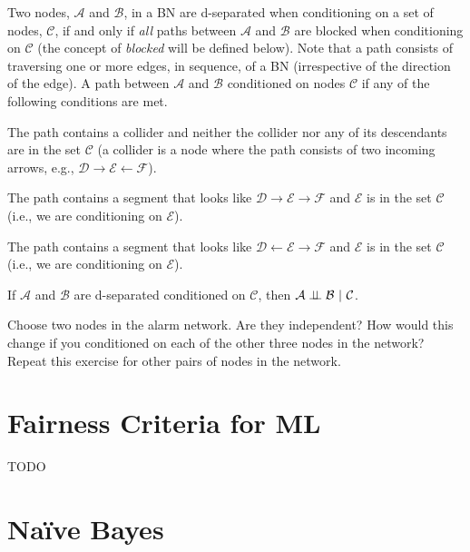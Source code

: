 \documentclass{tufte-handout}
\begin{document}
\begin{recall}
Two nodes, $\mathcal{A}$ and $\mathcal{B}$, in a BN are d-separated when conditioning on a set of nodes, $\mathcal{C}$, if and only if \emph{all} paths between  $\mathcal{A}$ and $\mathcal{B}$ are blocked when conditioning on $\mathcal{C}$ (the concept of \emph{blocked} will be defined below).  Note that a path consists of traversing one or more edges, in sequence, of a BN (irrespective of the direction of the edge).  A path between $\mathcal{A}$ and $\mathcal{B}$ conditioned on nodes $\mathcal{C}$ if any of the following conditions are met.
\be
\item The path contains a collider and neither the collider nor any of its descendants are in the set $\mathcal{C}$ (a collider is a node where the path consists of two incoming arrows, e.g., $\mathcal{D} \rightarrow \mathcal{E} \leftarrow \mathcal{F}$).
\item The path contains a segment that looks like $\mathcal{D} \rightarrow \mathcal{E} \rightarrow \mathcal{F}$ and $\mathcal{E}$ is in the set $\mathcal{C}$ (i.e., we are conditioning on $\mathcal{E}$).
\item The path contains a segment that looks like $\mathcal{D} \leftarrow \mathcal{E} \rightarrow \mathcal{F}$ and $\mathcal{E}$ is in the set $\mathcal{C}$ (i.e., we are conditioning on $\mathcal{E}$).
\ee


\vspace{1em}
\noindent If $\mathcal{A}$ and $\mathcal{B}$ are d-separated conditioned on $\mathcal{C}$, then $\mathcal{A} \perp\!\!\!\perp \mathcal{B}~|~\mathcal{C}$.

\end{recall}

\begin{exercise}
Choose two nodes in the alarm network.  Are they independent?  How would this change if you conditioned on each of the other three nodes in the network?  Repeat this exercise for other pairs of nodes in the network.
\end{exercise}

\section{Fairness Criteria for ML}

TODO

\section{Na\"ive Bayes}
\end{document}
